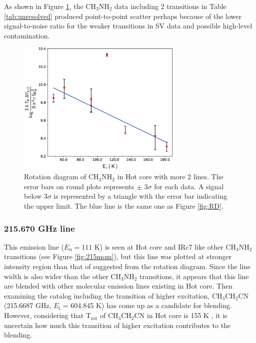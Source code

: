 As shown in Figure \ref{fig:RD_blend}, the CH$_{3}$NH$_{2}$ data including 2 transitions in Table \ref{tab:unresolved} 
produced point-to-point scatter perhaps because of the lower signal-to-noise ratio for the weaker transitions in SV data 
and possible high-level contamination.

\begin{figure}[htp]
  \centering
  \includegraphics[width=0.7\textwidth]{OrionKL/RD_blend.eps}
  \caption{Rotation diagram of CH$_{3}$NH$_{2}$ in Hot core with more 2 lines. The error bars on round plots represents $\pm$ 3$\sigma$ for each data. A signal below 3$\sigma$ is represented by a triangle with the error bar indicating the upper limit. The blue line is the same one as Figure \ref{fig:RD}.}
  \label{fig:RD_blend}
\end{figure}

\subsubsection*{215.670 GHz line}
This emission line ($E_{\mathrm{u}}=111$ K) is seen at Hot core and IRc7 like other CH$_{3}$NH$_{2}$ transitions 
(see Figure \ref{fig:215mom}), but this line was plotted at stronger intensity region than that of suggested from the rotation diagram.
Since the line width is also wider than the other CH$_{3}$NH$_{2}$ transitions, 
it appears that this line are blended with other molecular emission lines existing in Hot core.
Then examining the catalog including the transition of higher excitation, CH$_3$CH$_2$CN (215.6687 GHz, $E_{\mathrm{l}}$ = 604.845 K)
has come up as a candidate for blending.
However, considering that T$_{\mathrm{rot}}$ of CH$_3$CH$_2$CN in Hot core is 155 K \citep{Feng+2015}, 
it is uncertain how much this transition of higher excitation contributes to the blending.

